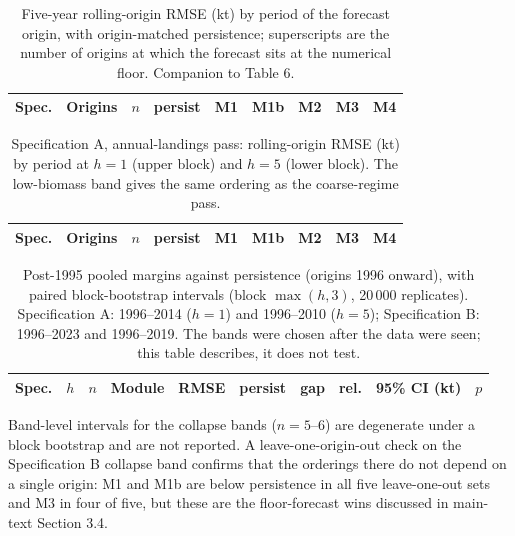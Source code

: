\begin{table}[!htb]
\centering\small
\caption{Five-year rolling-origin RMSE (kt) by period of the forecast origin, with origin-matched persistence; superscripts are the number of origins at which the forecast sits at the numerical floor. Companion to Table 6.}
\label{tab:si_h5}
\begin{tabular}{@{}llrrrrrrr@{}}
\toprule
Spec. & Origins & $n$ & persist & M1 & M1b & M2 & M3 & M4 \\
\midrule

\bottomrule
\end{tabular}
\end{table}

\begin{table}[!htb]
\centering\small
\caption{Specification A, annual-landings pass: rolling-origin RMSE (kt) by period at $h=1$ (upper block) and $h=5$ (lower block). The low-biomass band gives the same ordering as the coarse-regime pass.}
\label{tab:si_annual}
\begin{tabular}{@{}llrrrrrrr@{}}
\toprule
Spec. & Origins & $n$ & persist & M1 & M1b & M2 & M3 & M4 \\
\midrule

\bottomrule
\end{tabular}
\end{table}

\begin{table}[!htb]
\centering\small
\caption{Post-1995 pooled margins against persistence (origins 1996 onward), with paired block-bootstrap intervals (block $\max(h,3)$, 20\,000 replicates). Specification A: 1996--2014 ($h=1$) and 1996--2010 ($h=5$); Specification B: 1996--2023 and 1996--2019. The bands were chosen after the data were seen; this table describes, it does not test.}
\label{tab:si_post1995}
\begin{tabular}{@{}cccllrrrlr@{}}
\toprule
Spec. & $h$ & $n$ & Module & RMSE & persist & gap & rel. & 95\% CI (kt) & $p$ \\
\midrule

\bottomrule
\end{tabular}
\end{table}

Band-level intervals for the collapse bands ($n=5$--6) are degenerate under a block bootstrap and are not reported. A leave-one-origin-out check on the Specification B collapse band confirms that the orderings there do not depend on a single origin: M1 and M1b are below persistence in all five leave-one-out sets and M3 in four of five, but these are the floor-forecast wins discussed in main-text Section 3.4.

